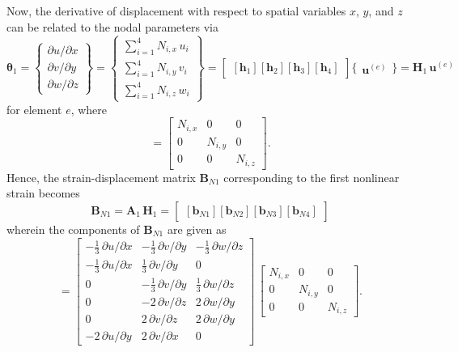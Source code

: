 Now, the derivative of displacement with respect to spatial variables $x$, $y$, and $z$ can be related to the nodal parameters via
\small
\begin{equation}
\boldsymbol{\theta}_1 =  \begin{Bmatrix}
\partial u / \partial x\\
\partial v / \partial y \\
\partial w / \partial z
\end{Bmatrix}
= \begin{Bmatrix}
\sum\nolimits_{i=1}^4 N_{i,x} \, u_i\\
\sum\nolimits_{i=1}^4 N_{i,y} \, v_i \\
\sum\nolimits_{i=1}^4 N_{i,z} \, w_i
\end{Bmatrix} 
= \begin{bmatrix}
[\mathbf{h}_1] [\mathbf{h}_2] [\mathbf{h}_3] [\mathbf{h}_4]
\end{bmatrix} \bigl\{ \begin{matrix} \mathbf{u}^{(e)} \end{matrix} \bigr\}  
= \mathbf{H}_1 \, \mathbf{u}^{(e)} 
\end{equation}
\normalsize
for element $e$, where 
\begin{equation}
[\mathbf{h}_i] = \begin{bmatrix}
N_{i,x} &  0 & 0  \\
0 & N_{i,y} & 0  \\
0 & 0 & N_{i,z}\end{bmatrix} .
\end{equation}
Hence, the strain-displacement matrix $\mathbf{B}_{N1}$ corresponding to the first nonlinear strain becomes
\begin{equation}
\mathbf{B}_{N1} = \mathbf{A}_1 \, \mathbf{H}_1 = \begin{bmatrix}
[\mathbf{b}_{N1}] [\mathbf{b}_{N2}] [\mathbf{b}_{N3}] [\mathbf{b}_{N4}] 
\end{bmatrix} 
\end{equation}
wherein the components of $\mathbf{B}_{N1}$ are given as
\begin{equation}
[\mathbf{b}_{Ni}] = \begin{bmatrix}
	-\tfrac{1}{3} \, \partial u / \partial x &  - \tfrac{1}{3} \, \partial v / \partial y & -\tfrac{1}{3} \, \partial w / \partial z  \\
	-\tfrac{1}{3} \, \partial u / \partial x &  \tfrac{1}{3} \, \partial v / \partial y & 0  \\
	0  & -\tfrac{1}{3} \, \partial v / \partial y & \tfrac{1}{3} \, \partial w / \partial z \\
	0 &  - 2 \, \partial v / \partial z &  2 \,  \partial w / \partial y  \\
	0 &  2 \, \partial v / \partial z  & 2 \,  \partial w / \partial y  \\
	- 2 \, \partial u / \partial y &   2 \, \partial v / \partial x & 0   \end{bmatrix}  \, \begin{bmatrix}
N_{i,x} &  0 & 0  \\
0 & N_{i,y} & 0  \\
0 & 0 & N_{i,z} \end{bmatrix}. 
\end{equation}

